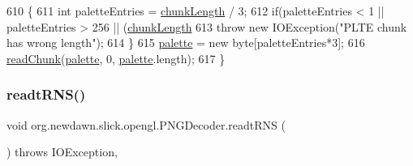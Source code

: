 \begin{DoxyCode}
610                                                \{
611         \textcolor{keywordtype}{int} paletteEntries = \mbox{\hyperlink{classorg_1_1newdawn_1_1slick_1_1opengl_1_1_p_n_g_decoder_aeb23de3eba5a6505ee1dd16094f78d7b}{chunkLength}} / 3;
612         \textcolor{keywordflow}{if}(paletteEntries < 1 || paletteEntries > 256 || (\mbox{\hyperlink{classorg_1_1newdawn_1_1slick_1_1opengl_1_1_p_n_g_decoder_aeb23de3eba5a6505ee1dd16094f78d7b}{chunkLength}} %
613             \textcolor{keywordflow}{throw} \textcolor{keyword}{new} IOException(\textcolor{stringliteral}{"PLTE chunk has wrong length"});
614         \}
615         \mbox{\hyperlink{classorg_1_1newdawn_1_1slick_1_1opengl_1_1_p_n_g_decoder_ad65d46461f9f8df68a6b5551d56d8479}{palette}} = \textcolor{keyword}{new} byte[paletteEntries*3];
616         \mbox{\hyperlink{classorg_1_1newdawn_1_1slick_1_1opengl_1_1_p_n_g_decoder_ae2014f14734121c02f976b1fe4733c2d}{readChunk}}(\mbox{\hyperlink{classorg_1_1newdawn_1_1slick_1_1opengl_1_1_p_n_g_decoder_ad65d46461f9f8df68a6b5551d56d8479}{palette}}, 0, \mbox{\hyperlink{classorg_1_1newdawn_1_1slick_1_1opengl_1_1_p_n_g_decoder_ad65d46461f9f8df68a6b5551d56d8479}{palette}}.length);
617     \}
\end{DoxyCode}
\mbox{\label{classorg_1_1newdawn_1_1slick_1_1opengl_1_1_p_n_g_decoder_a4f69d28cdeb7cbd83b4b6dfef7662e48}} 
\subsubsection{\texorpdfstring{readt\+R\+N\+S()}{readtRNS()}}
{\footnotesize\ttfamily void org.\+newdawn.\+slick.\+opengl.\+P\+N\+G\+Decoder.\+readt\+R\+NS (\begin{DoxyParamCaption}{ }\end{DoxyParamCaption}) throws I\+O\+Exception\hspace{0.3cm}{\ttfamily [inline]}, {\ttfamily [private]}}


